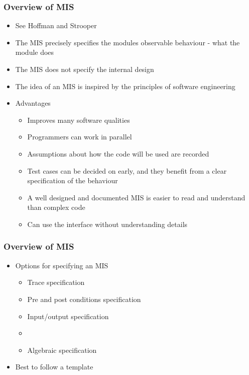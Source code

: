 \documentclass[t,12pt,numbers,fleqn]{beamer}
\begin{document}

\begin{frame}
\frametitle{Overview of MIS}
\begin{itemize}
\item See Hoffman and Strooper \cite{HoffmanAndStrooper1995}
\item The MIS precisely specifies the modules observable behaviour - what the module does
\item The MIS does not specify the internal design
\item The idea of an MIS is inspired by the principles of software engineering
\item Advantages
\begin{itemize}
\item Improves many software qualities
\item Programmers can work in parallel
\item Assumptions about how the code will be used are recorded
\item Test cases can be decided on early, and they benefit from a clear specification of the behaviour
\item A well designed and documented MIS is easier to read and understand than complex code
\item Can use the interface without understanding details
\end{itemize}
\end{itemize}
\end{frame}


\begin{frame}
\frametitle{Overview of MIS}
\begin{itemize}
\item Options for specifying an MIS
\begin{itemize}
\item Trace specification
\item Pre and post conditions specification
\item Input/output specification
\item {}
\item Algebraic specification
\end{itemize}
\item Best to follow a template
\end{itemize}
\end{frame}
\end{document}
